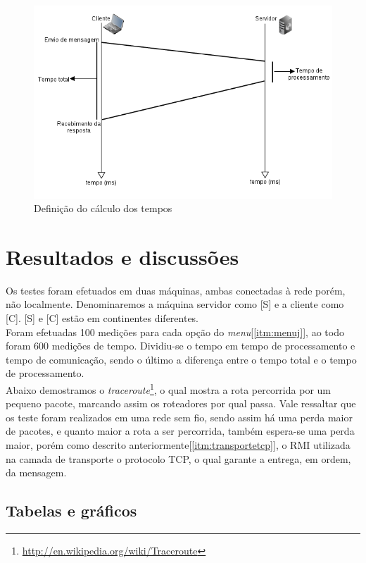 \documentclass[a4paper,10pt]{article}
\begin{document}
\newpage
\begin{figure}[!htb]
  \centering
  \label{fluxotempo}
  \includegraphics[scale=0.5]{fluxo_tempo.png}
  \caption{Definição do cálculo dos tempos}
\end{figure}
\newpage
\section{Resultados e discussões}
Os testes foram efetuados em duas máquinas, ambas conectadas à rede porém, não localmente. Denominaremos a máquina servidor como [S] e a cliente como [C]. [S] e [C] estão em continentes diferentes.
\\Foram efetuadas 100 medições para cada opção do \emph{menu}[\ref{itm:menuj}], ao todo foram 600 medições de tempo. Dividiu-se o tempo em tempo de processamento e tempo de comunicação, sendo o último a diferença entre o tempo total e o tempo de processamento.
\\Abaixo demostramos o \emph{traceroute}\footnote{\url{http://en.wikipedia.org/wiki/Traceroute}}, o qual mostra a rota percorrida por um pequeno pacote, marcando assim os roteadores por qual passa. Vale ressaltar que os teste 
foram realizados em uma rede sem fio, sendo assim há uma perda maior de pacotes, e quanto maior a rota a ser percorrida, também espera-se uma perda maior, porém 
como descrito anteriormente[\ref{itm:transportetcp}], o RMI utilizada na camada de transporte o protocolo TCP, o qual garante a entrega, em ordem, da mensagem.

\subsection{Tabelas e gráficos}
\end{document}
